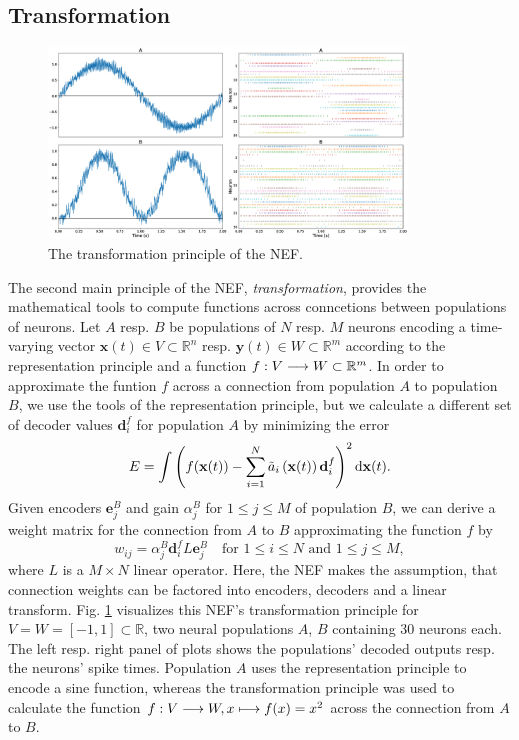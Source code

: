 \subsection{Transformation}
\begin{figure}[t]
	\centering
	\includegraphics[width=0.85\textwidth]{imgs/NEF_transformation.eps}
	\caption{The transformation principle of the \ac{NEF}.}
	\label{fig:nef_transformation}
\end{figure}
The second main principle of the \ac{NEF}, \emph{transformation}, provides the mathematical tools to compute functions across conncetions between populations of neurons.
Let $A$ resp. $B$ be populations of $N$ resp. $M$ neurons encoding a time-varying vector $\mathbf{x}(t) \in V \subset \mathbb{R}^{n}$ resp. $\mathbf{y}(t) \in W \subset \mathbb{R}^{m}$ according to the representation principle and a function $f: V \longrightarrow W \subset \mathbb{R}^{m}$.
In order to approximate the funtion $f$ across a connection from population $A$ to population $B$, we use the tools of the representation principle, but we calculate a different set of decoder values $\mathbf{d}_{i}^{f}$ for population $A$ by minimizing the error
\begin{equation}
\label{eq:nef_transformation}
E = \int \left( f(\mathbf{x}(t)) - \sum_{i=1}^{N} \tilde{a}_{i}\left(\mathbf{x}(t)\right) \mathbf{d}_{i}^{f}\right)^{2} \mathop{}\!\mathrm{d} \mathbf{x}(t).
\end{equation}
Given encoders $\mathbf{e}_{j}^{B}$ and gain $\alpha_{j}^{B}$ for $1 \leq j \leq M$ of population $B$, we can derive a weight matrix for the connection from $A$ to $B$ approximating the function $f$ by
\begin{equation}
w_{ij} = \alpha_{j}^{B} \mathbf{d}_{i}^{f} L \mathbf{e}_{j}^{B} \quad \textrm{for } 1 \leq i \leq N \textrm{ and } 1 \leq j \leq M,
\end{equation}
where $L$ is a $M \times N$ linear operator.
Here, the \ac{NEF} makes the assumption, that connection weights can be factored into encoders, decoders and a linear transform.
Fig. \ref{fig:nef_transformation} visualizes this \ac{NEF}'s transformation principle for $V = W = \left[ -1, 1\right] \subset \mathbb{R}$, two neural populations $A$, $B$ containing $30$ neurons each.
The left resp. right panel of plots shows the populations' decoded outputs resp. the neurons' spike times.
Population $A$ uses the representation principle to encode a sine function, whereas the transformation principle was used to calculate the function $f: V \longrightarrow W, x \longmapsto f(x)=x^{2}$ across the connection from $A$ to $B$.

